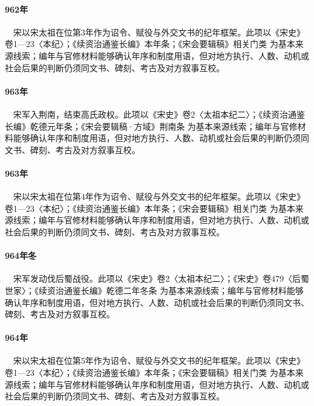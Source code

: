 \paragraph{962年}　宋以宋太祖在位第3年作为诏令、赋役与外交文书的纪年框架。此项以《宋史》卷1—23〈本纪〉；《续资治通鉴长编》本年条；《宋会要辑稿》相关门类 为基本来源线索；编年与官修材料能够确认年序和制度用语，但对地方执行、人数、动机或社会后果的判断仍须同文书、碑刻、考古及对方叙事互校。

\paragraph{963年}　宋军入荆南，结束高氏政权。此项以《宋史》卷2〈太祖本纪二〉；《续资治通鉴长编》乾德元年条；《宋会要辑稿·方域》荆南条 为基本来源线索；编年与官修材料能够确认年序和制度用语，但对地方执行、人数、动机或社会后果的判断仍须同文书、碑刻、考古及对方叙事互校。

\paragraph{963年}　宋以宋太祖在位第4年作为诏令、赋役与外交文书的纪年框架。此项以《宋史》卷1—23〈本纪〉；《续资治通鉴长编》本年条；《宋会要辑稿》相关门类 为基本来源线索；编年与官修材料能够确认年序和制度用语，但对地方执行、人数、动机或社会后果的判断仍须同文书、碑刻、考古及对方叙事互校。

\paragraph{964年冬}　宋军发动伐后蜀战役。此项以《宋史》卷2〈太祖本纪二〉；《宋史》卷479〈后蜀世家〉；《续资治通鉴长编》乾德二年冬条 为基本来源线索；编年与官修材料能够确认年序和制度用语，但对地方执行、人数、动机或社会后果的判断仍须同文书、碑刻、考古及对方叙事互校。

\paragraph{964年}　宋以宋太祖在位第5年作为诏令、赋役与外交文书的纪年框架。此项以《宋史》卷1—23〈本纪〉；《续资治通鉴长编》本年条；《宋会要辑稿》相关门类 为基本来源线索；编年与官修材料能够确认年序和制度用语，但对地方执行、人数、动机或社会后果的判断仍须同文书、碑刻、考古及对方叙事互校。

